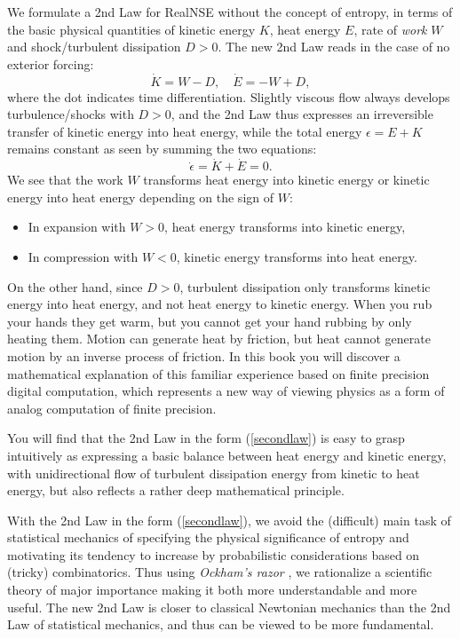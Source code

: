 We formulate a 2nd Law for RealNSE 
without the concept of entropy, in terms of  
the basic physical quantities of kinetic energy
$K$, heat energy $E$, rate of \emph{work} $W$ and shock/turbulent dissipation
$D>0$. The new 2nd Law reads in the case of no exterior forcing:
\begin{equation}\label{secondlaw}
\dot K=W-D,\quad \dot E=-W+D,
\end{equation}
where the dot indicates time differentiation. Slightly viscous
flow always develops turbulence/shocks with $D>0$, and the  
2nd Law thus expresses an irreversible transfer of kinetic energy
into heat energy, while the total energy $\epsilon =E+K$ remains constant as seen by summing the two equations:
\begin{equation}\label{secondlawtotalenergy}
\dot\epsilon =\dot K+\dot E=0.
\end{equation}
We see that the work $W$ transforms heat energy into kinetic energy or kinetic energy into heat 
energy depending on the sign of $W$: 
\begin{itemize}
\item In expansion with $W > 0$, heat energy transforms into kinetic energy,
\item In compression with $W < 0$, kinetic energy transforms into heat energy.
\end{itemize}
On the other hand, since $D>0$, turbulent dissipation only transforms kinetic energy into heat energy,
and not heat energy to kinetic energy. When you rub your hands they get warm, but you cannot 
get your hand rubbing by only heating them. Motion can generate heat by friction, but heat cannot 
generate motion by an inverse process of friction. In this book you will discover a mathematical explanation 
of this familiar experience based on finite precision digital computation, which represents a new way of 
viewing physics as a form of analog computation of finite precision.     

You will find that the 2nd Law in the form  (\ref{secondlaw}) is easy to grasp intuitively 
as expressing a basic balance between heat energy and kinetic energy, with unidirectional flow 
of turbulent dissipation energy from kinetic to heat energy, but also reflects a rather deep 
mathematical principle.       

With the 2nd Law in the form (\ref{secondlaw}), we 
avoid the (difficult) main task of 
statistical mechanics 
of specifying the physical significance of entropy and motivating its
tendency to increase by probabilistic considerations based on
(tricky) combinatorics. Thus using \emph{Ockham's razor} \cite{ockham},
we rationalize a scientific theory of major importance making it both
more understandable and more useful. The new 2nd Law is closer to 
classical Newtonian mechanics than the 2nd Law of statistical mechanics, 
and thus can be viewed to be more fundamental. 

